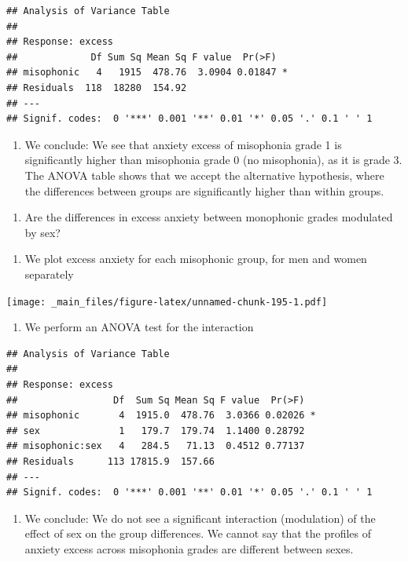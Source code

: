 \documentclass[
]{book}
\providecommand{\tightlist}{%
  \setlength{\itemsep}{0pt}\setlength{\parskip}{0pt}}
\begin{document}
\begin{verbatim}
## Analysis of Variance Table
## 
## Response: excess
##             Df Sum Sq Mean Sq F value  Pr(>F)  
## misophonic   4   1915  478.76  3.0904 0.01847 *
## Residuals  118  18280  154.92                  
## ---
## Signif. codes:  0 '***' 0.001 '**' 0.01 '*' 0.05 '.' 0.1 ' ' 1
\end{verbatim}

\begin{enumerate}
\def\labelenumi{\alph{enumi}.}
\setcounter{enumi}{2}
\tightlist
\item
  We conclude: We see that anxiety excess of misophonia grade 1 is significantly higher than misophonia grade 0 (no misophonia), as it is grade 3. The ANOVA table shows that we accept the alternative hypothesis, where the differences between groups are significantly higher than within groups.
\end{enumerate}

\begin{enumerate}
\def\labelenumi{\arabic{enumi}.}
\setcounter{enumi}{5}
\tightlist
\item
  Are the differences in excess anxiety between monophonic grades modulated by sex?
\end{enumerate}

\begin{enumerate}
\def\labelenumi{\alph{enumi}.}
\tightlist
\item
  We plot excess anxiety for each misophonic group, for men and women separately
\end{enumerate}

\texttt{[image: \_main\_files/figure-latex/unnamed-chunk-195-1.pdf]}

\begin{enumerate}
\def\labelenumi{\alph{enumi}.}
\setcounter{enumi}{1}
\tightlist
\item
  We perform an ANOVA test for the interaction
\end{enumerate}

\begin{verbatim}
## Analysis of Variance Table
## 
## Response: excess
##                 Df  Sum Sq Mean Sq F value  Pr(>F)  
## misophonic       4  1915.0  478.76  3.0366 0.02026 *
## sex              1   179.7  179.74  1.1400 0.28792  
## misophonic:sex   4   284.5   71.13  0.4512 0.77137  
## Residuals      113 17815.9  157.66                  
## ---
## Signif. codes:  0 '***' 0.001 '**' 0.01 '*' 0.05 '.' 0.1 ' ' 1
\end{verbatim}

\begin{enumerate}
\def\labelenumi{\alph{enumi}.}
\setcounter{enumi}{2}
\tightlist
\item
  We conclude: We do not see a significant interaction (modulation) of the effect of sex on the group differences. We cannot say that the profiles of anxiety excess across misophonia grades are different between sexes.
\end{enumerate}

  
\end{document}

